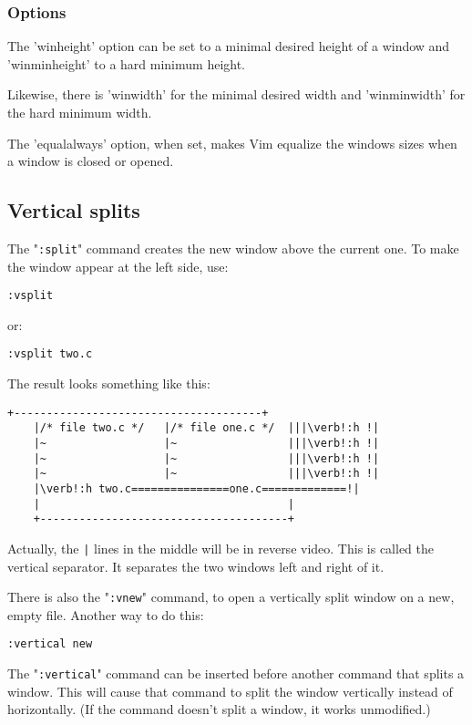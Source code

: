 \subsubsection{Options}
The 'winheight' option can be set to a minimal desired height of a window and 'winminheight' to a hard minimum height.

Likewise, there is 'winwidth' for the minimal desired width and 'winminwidth' for the hard minimum width.

The 'equalalways' option, when set, makes Vim equalize the windows sizes when a window is closed or opened.

\subsection{Vertical splits}
The "\verb!:split!" command creates the new window above the current one.
To make the window appear at the left side, use:

 \begin{Verbatim}[samepage=true]
 :vsplit
 \end{Verbatim}

or:
 \begin{Verbatim}[samepage=true]
 :vsplit two.c
 \end{Verbatim}

The result looks something like this:

\begin{Verbatim}[samepage=true]
    +--------------------------------------+
    |/* file two.c */   |/* file one.c */  |||\verb!:h !|
    |~                  |~                 |||\verb!:h !|
    |~                  |~                 |||\verb!:h !|
    |~                  |~                 |||\verb!:h !|
    |\verb!:h two.c===============one.c=============!|
    |                                      |
    +--------------------------------------+
\end{Verbatim}

Actually, the \verb!|! lines in the middle will be in reverse video.
This is called the vertical separator.
It separates the two windows left and right of it.

There is also the "\verb!:vnew!" command, to open a vertically split window on a new, empty file.
Another way to do this:

 \begin{Verbatim}[samepage=true]
 :vertical new
 \end{Verbatim}

The "\verb!:vertical!" command can be inserted before another command that splits a window.
This will cause that command to split the window vertically instead of horizontally.
(If the command doesn't split a window, it works unmodified.)

